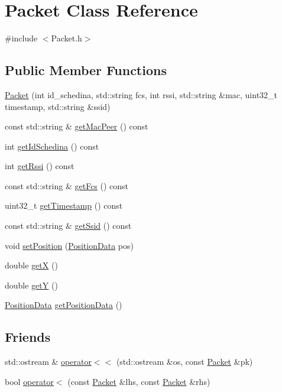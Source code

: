 \hypertarget{class_packet}{}\section{Packet Class Reference}
\label{class_packet}


{\ttfamily \#include $<$Packet.\+h$>$}

\subsection*{Public Member Functions}
\begin{DoxyCompactItemize}
\item 
\hyperlink{class_packet_a2de1c15db947aa3b1e91e1aec8168357}{Packet} (int id\+\_\+schedina, std\+::string fcs, int rssi, std\+::string \&mac, uint32\+\_\+t timestamp, std\+::string \&ssid)
\item 
const std\+::string \& \hyperlink{class_packet_ae56fcb3dd448b891279b46795d3b25c4}{get\+Mac\+Peer} () const
\item 
int \hyperlink{class_packet_a958820970e1756ad312c30a0bf76ef42}{get\+Id\+Schedina} () const
\item 
int \hyperlink{class_packet_aa2eb8485b8edd547f2c37710b68e8876}{get\+Rssi} () const
\item 
const std\+::string \& \hyperlink{class_packet_aefc0b0eb863a800079b82b5491cc313c}{get\+Fcs} () const
\item 
uint32\+\_\+t \hyperlink{class_packet_a2e14c61ea96af10b11d2c3f72e85f85f}{get\+Timestamp} () const
\item 
const std\+::string \& \hyperlink{class_packet_a32b7a7fe06e562dd126de88ab0da517d}{get\+Ssid} () const
\item 
void \hyperlink{class_packet_aba2f74812c4345a0dd24235eb1c96028}{set\+Position} (\hyperlink{class_position_data}{Position\+Data} pos)
\item 
double \hyperlink{class_packet_a5f5546101c133425bb797f2cf6ed23a9}{getX} ()
\item 
double \hyperlink{class_packet_a6aac4737a0da248a9d77680b62597b93}{getY} ()
\item 
\hyperlink{class_position_data}{Position\+Data} \hyperlink{class_packet_afd40ba0c05a6199c81b2ff59eb594b1c}{get\+Position\+Data} ()
\end{DoxyCompactItemize}
\subsection*{Friends}
\begin{DoxyCompactItemize}
\item 
std\+::ostream \& \hyperlink{class_packet_a1dc8c16669bac2880a3e5a02d3a06e89}{operator$<$$<$} (std\+::ostream \&os, const \hyperlink{class_packet}{Packet} \&pk)
\item 
bool \hyperlink{class_packet_af6dc4841b04ebf1cbc7af6131b50a16d}{operator$<$} (const \hyperlink{class_packet}{Packet} \&lhs, const \hyperlink{class_packet}{Packet} \&rhs)
\end{DoxyCompactItemize}


